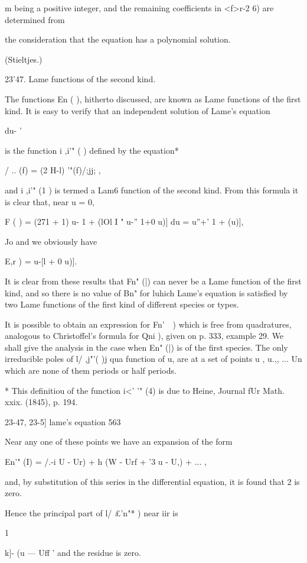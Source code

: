 {{{{{{{m being a positive integer, and the remaining coefficients in <f>r-2
6) are determined from

the consideration that the equation has a polynomial solution.

(Stieltjes.)

23'47. Lame functions of the second kind.

The functions En ( ), hitherto discussed, are known as Lame functions
of the first kind. It is easy to verify that an independent solution
of Lame's equation

du- '

is the function i ,i'" ( ) defined by the equation*

/ .. (f) = (2 H-l) '"(f)/;jj; ,

and i ,i'" (1 ) is termed a Lam6 function of the second kind. From
this formula it is clear that, near u = 0,

F ( ) = (271 + 1) u- 1 + (lOl I " u-'' 1+0 u)] du = u''+' 1 + (u)],

Jo and we obviously have

E,r ) = u-[l + 0 u)].

It is clear from these results that Fn" (|) can never be a Lame
function of the first kind, and so there is no value of Bn" for luhich
Lame's equation is satisfied by two Lame functions of the first kind
of different species or types.

It is possible to obtain an expression for Fn'\ \ ) which is free from
quadratures, analogous to Christoffel's formula for Qni ), given on p.
333, example 29. We shall give the analysis in the case when En" (|)
is of the first species. The only irreducible poles of l/ ,j"'( )j qua
function of u, are at a set of points u , u.,, ... Un which are none
of them periods or half periods.

* This definitiou of the function i<' '" (4) is due to Heine, Journal
fUr Math. xxix. (1845), p. 194.

23-47, 23-5] lame's equation 563

Near any one of these points we have an expansion of the form

En'" (I) = /.-i U - Ur) + h (W - Urf + '3 u - U,) + ... ,

and, by substitution of this series in the differential equation, it
is found that 2 is zero.

Hence the principal part of l/ £'n"* ) near iir is

1

k]- (u — Uff ' and the residue is zero.

}}}}}}}
